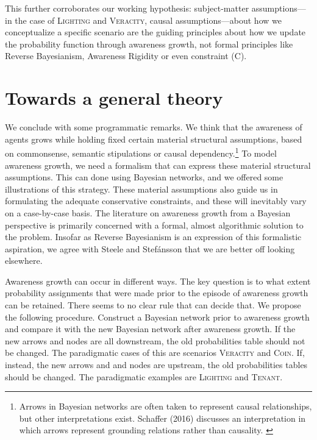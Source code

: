 \documentclass[
  11pt,
  dvipsnames,enabledeprecatedfontcommands]{scrartcl}
\begin{document}
This further corroborates our working hypothesis: subject-matter
assumptions---in the case of \textsc{Lighting} and \textsc{Veracity},
causal assumptions---about how we conceptualize a specific scenario are
the guiding principles about how we update the probability function
through awareness growth, not formal principles like Reverse
Bayesianism, Awareness Rigidity or even constraint (C).

\hypertarget{towards-a-general-theory}{%
\section{Towards a general theory}\label{towards-a-general-theory}}

We conclude with some programmatic remarks. We think that the awareness
of agents grows while holding fixed certain material structural
assumptions, based on commonsense, semantic stipulations or causal
dependency.\footnote{Arrows in Bayesian networks are often taken to
  represent causal relationships, but other interpretations exist.
  Schaffer (2016) discusses an interpretation in which arrows represent
  grounding relations rather than causality. \label{footnote:causation}}
To model awareness growth, we need a formalism that can express these
material structural assumptions. This can done using Bayesian networks,
and we offered some illustrations of this strategy. These material
assumptions also guide us in formulating the adequate conservative
constraints, and these will inevitably vary on a case-by-case basis. The
literature on awareness growth from a Bayesian perspective is primarily
concerned with a formal, almost algorithmic solution to the problem.
Insofar as Reverse Bayesianism is an expression of this formalistic
aspiration, we agree with Steele and Stefánsson that we are better off
looking elsewhere.

Awareness growth can occur in different ways. The key question is to
what extent probability assignments that were made prior to the episode
of awareness growth can be retained. There seems to no clear rule that
can decide that. We propose the following procedure. Construct a
Bayesian network prior to awareness growth and compare it with the new
Bayesian network after awareness growth. If the new arrows and nodes are
all downstream, the old probabilities table should not be changed. The
paradigmatic cases of this are scenarios \textsc{Veracity} and
\textsc{Coin}. If, instead, the new arrows and and nodes are upstream,
the old probabilities tables should be changed. The paradigmatic
examples are \textsc{Lighting} and \textsc{Tenant}.
\end{document}
